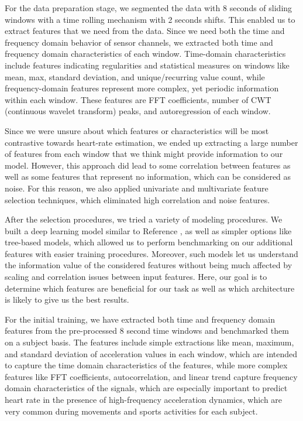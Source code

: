 \documentclass[12pt, conference]{IEEEtran}
\begin{document}
For the data preparation stage, we segmented the data with 8 seconds of sliding windows with a time rolling mechanism with 2 seconds shifts. This enabled us to extract features that we need from the data. Since we need both the time and frequency domain behavior of sensor channels, we extracted both time and frequency domain characteristics of each window. Time-domain characteristics include features indicating regularities and statistical measures on windows like mean, max, standard deviation, and unique/recurring value count, while frequency-domain features represent more complex, yet periodic information within each window. These features are FFT coefficients, number of CWT (continuous wavelet transform) peaks, and autoregression of each window. 

Since we were unsure about which features or characteristics will be most contrastive towards heart-rate estimation, we ended up extracting a large number of features from each window that we think might provide information to our model. However, this approach did lead to some correlation between features as well as some features that represent no information, which can be considered as noise. For this reason, we also applied univariate and multivariate feature selection techniques, which eliminated high correlation and noise features. 

After the selection procedures, we tried a variety of modeling procedures. We built a deep learning model similar to Reference \cite{reiss2019deep}, as well as simpler options like tree-based models, which allowed us to perform benchmarking on our additional features with easier training procedures. Moreover, such models let us understand the information value of the considered features without being much affected by scaling and correlation issues between input features. Here, our goal is to determine which features are beneficial for our task as well as which architecture is likely to give us the best results.
    
For the initial training, we have extracted both time and frequency domain features from the pre-processed 8 second time windows and benchmarked them on a subject basis. The features include simple extractions like mean, maximum, and standard deviation of acceleration values in each window, which are intended to capture the time domain characteristics of the features, while more complex features like FFT coefficients, autocorrelation, and linear trend capture frequency domain characteristics of the signals, which are especially important to predict heart rate in the presence of high-frequency acceleration dynamics, which are very common during movements and sports activities for each subject.
\end{document}
